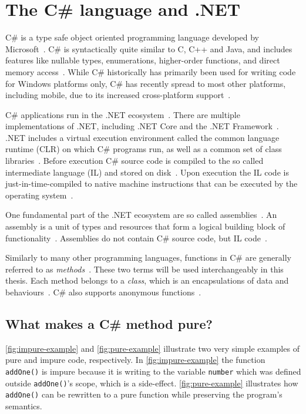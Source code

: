 \documentclass[a4paper,12pt]{article}
\begin{document}
\section{The C\# language and .NET} \label{sub:the-csharp-language}

C\# is a type safe object oriented programming language developed by Microsoft~\cite{albahari2003nutshell}. C\# is syntactically quite similar to C, C++ and Java, and includes features like nullable types, enumerations, higher-order functions, and direct memory access~\cite{intro-to-Csharp}. While C\# historically has primarily been used for writing code for Windows platforms only, C\# has recently spread to most other platforms, including mobile, due to its increased cross-platform support~\cite{albahari2003nutshell}.

C\# applications run in the .NET ecosystem~\cite{intro-to-Csharp}. There are multiple implementations of .NET, including .NET Core and the .NET Framework~\cite{intro-to-Csharp}. .NET includes a virtual execution environment called the common language runtime (CLR) on which C\# programs run, as well as a common set of class libraries~\cite{albahari2003nutshell}. Before execution C\# source code is compiled to the so called intermediate language (IL) and stored on disk~\cite{intro-to-Csharp}. Upon execution the IL code is just-in-time-compiled to native machine instructions that can be executed by the operating system~\cite{intro-to-Csharp}.

One fundamental part of the .NET ecosystem are so called assemblies~\cite{assemblies}. An assembly is a unit of types and resources that form a logical building block of functionality~\cite{assemblies}. Assemblies do not contain C\# source code, but IL code~\cite{assemblies-overview}.

Similarly to many other programming languages, functions in C\# are generally referred to as \textit{methods}~\cite{albahari2003nutshell}. These two terms will be used interchangeably in this thesis. Each method belongs to a \textit{class}, which is an encapsulations of data and behaviours~\cite{albahari2003nutshell}. C\# also supports anonymous functions~\cite{albahari2003nutshell}.

\subsection{What makes a C\# method pure?} \label{sub:What makes a Cs program functional?}

\autoref{fig:impure-example} and \autoref{fig:pure-example} illustrate two very simple examples of pure and impure code, respectively. In \autoref{fig:impure-example} the function \texttt{addOne()} is impure because it is writing to the variable \texttt{number} which was defined outside \texttt{addOne()}'s scope, which is a side-effect. \autoref{fig:pure-example} illustrates how \texttt{addOne()} can be rewritten to a pure function while preserving the program's semantics.
\end{document}
